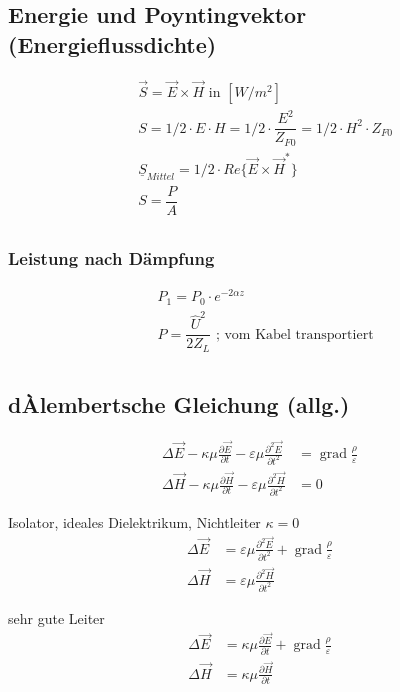 \subsection{Energie und Poyntingvektor (Energieflussdichte)}
\begin{align*}
    &\vec{S} = \vec{E}\times\vec{H} \text{ in } [W/m^2]\\
    &S = 1/2 \cdot E \cdot H = 1/2 \cdot \dfrac{E^2}{Z_{F0}} = 1/2 \cdot H^2 \cdot Z_{F0}\\
    &\underline{S}_{Mittel} = 1/2 \cdot Re\{\vec{E}\times\vec{H}^*\}\\
    &S = \dfrac{P}{A}\\
\end{align*}
\subsubsection{Leistung nach Dämpfung}
\begin{align*}
    &P_1 = P_0 \cdot e^{-2\alpha z}\\
    & P = \dfrac{\hat{U}^2}{2 Z_L} \text{ ; vom Kabel transportiert}\\
\end{align*}
\subsection{dÀlembertsche Gleichung (allg.)}

\begin{align*}
    \Delta \vec{E}-\kappa \mu \frac{\partial \vec{E}}{\partial t}-\varepsilon \mu \frac{\partial^{2} \vec{E}}{\partial t^{2}} & = \operatorname{grad} \frac{\rho}{\varepsilon} \\
    \Delta \vec{H}-\kappa \mu \frac{\partial \vec{H}}{\partial t}-\varepsilon \mu \frac{\partial^{2} \vec{H}}{\partial t^{2}} & = 0
\end{align*}

Isolator, ideales Dielektrikum, Nichtleiter $\kappa = 0$
\begin{align*}
    \Delta \vec{E} & =\varepsilon \mu \frac{\partial^{2} \vec{E}}{\partial t^{2}}+\operatorname{grad} \frac{\rho}{\varepsilon} \\
    \Delta \vec{H} & =\varepsilon \mu \frac{\partial^{2} \vec{H}}{\partial t^{2}}
\end{align*}

sehr gute Leiter
\begin{align*}
    \Delta \vec{E} & =\kappa \mu \frac{\partial \vec{E}}{\partial t}+\operatorname{grad} \frac{\rho}{\varepsilon} \\
    \Delta \vec{H} & =\kappa \mu \frac{\partial \vec{H}}{\partial t}
\end{align*}

